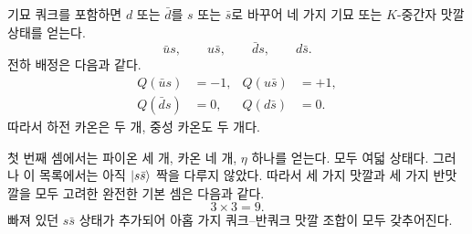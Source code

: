 기묘 쿼크를 포함하면 \(d\) 또는 \(\bar d\)를 \(s\) 또는 \(\bar s\)로 바꾸어 네 가지 기묘 또는 \(K\)-중간자 맛깔 상태를 얻는다.
\begin{equation}
\bar u s,\qquad u\bar s,\qquad \bar d s,\qquad d\bar s.
\end{equation}
전하 배정은 다음과 같다.
\begin{align}
Q(\bar u s) &=-1,
&
Q(u\bar s) &=+1,
\\
Q(\bar d s) &=0,
&
Q(d\bar s) &=0.
\end{align}
따라서 하전 카온은 두 개, 중성 카온도 두 개다.

첫 번째 셈에서는 파이온 세 개, 카온 네 개, \(\eta\) 하나를 얻는다. 모두 여덟 상태다. 그러나 이 목록에서는 아직 \(\left\lvert s\bar s\right\rangle\) 짝을 다루지 않았다. 따라서 세 가지 맛깔과 세 가지 반맛깔을 모두 고려한 완전한 기본 셈은 다음과 같다.
\begin{equation}
3\times3=9.
\end{equation}
빠져 있던 \(s\bar s\) 상태가 추가되어 아홉 가지 쿼크--반쿼크 맛깔 조합이 모두 갖추어진다.
